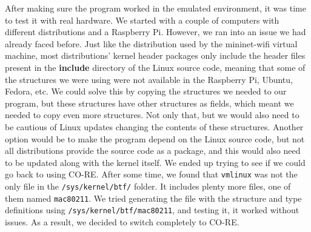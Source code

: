 After making sure the program worked in the emulated environment, it was time to
test it with real hardware. We started with a couple of computers with different
distributions and a Raspberry Pi. However, we ran into an issue we had already
faced before. Just like the distribution used by the mininet-wifi virtual
machine, most distributions' kernel header packages only include the header
files present in the \textbf{include} directory of the Linux source code,
meaning that some of the structures we were using were not available in the
Raspberry Pi, Ubuntu, Fedora, etc. We could solve this by copying the structures
we needed to our program, but these structures have other structures as fields,
which meant we needed to copy even more structures. Not only that, but we would
also need to be cautious of Linux updates changing the contents of these
structures. Another option would be to make the program depend on the Linux
source code, but not all distributions provide the source code as a package, and
this would also need to be updated along with the kernel itself. We ended up
trying to see if we could go back to using \ac{CO-RE}. After some time, we found
that \texttt{vmlinux} was not the only file in the \texttt{/sys/kernel/btf/}
folder. It includes plenty more files, one of them named \texttt{mac80211}. We
tried generating the file with the structure and type definitions using
\texttt{/sys/kernel/btf/mac80211}, and testing it, it worked without issues. As
a result, we decided to switch completely to \ac{CO-RE}.

